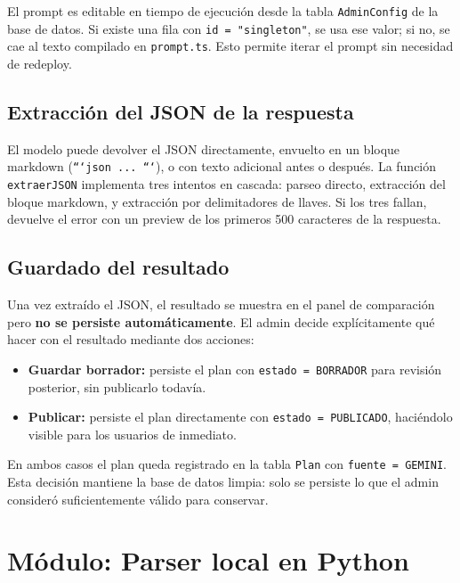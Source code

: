 \documentclass[12pt, a4paper]{report}
\begin{document}
El prompt es editable en tiempo de ejecución desde la tabla \texttt{AdminConfig}
de la base de datos. Si existe una fila con \texttt{id = "singleton"}, se usa ese
valor; si no, se cae al texto compilado en \texttt{prompt.ts}. Esto permite iterar
el prompt sin necesidad de redeploy.

\subsection{Extracción del JSON de la respuesta}

El modelo puede devolver el JSON directamente, envuelto en un bloque markdown
(\texttt{```json ... ```}), o con texto adicional antes o después. La función
\texttt{extraerJSON} implementa tres intentos en cascada: parseo directo,
extracción del bloque markdown, y extracción por delimitadores de llaves.
Si los tres fallan, devuelve el error con un preview de los primeros 500
caracteres de la respuesta.

\subsection{Guardado del resultado}
\label{sec:guardado-resultado}

Una vez extraído el JSON, el resultado se muestra en el panel de comparación pero
\textbf{no se persiste automáticamente}. El admin decide explícitamente qué hacer
con el resultado mediante dos acciones:

\begin{itemize}
  \item \textbf{Guardar borrador:} persiste el plan con \texttt{estado = BORRADOR}
        para revisión posterior, sin publicarlo todavía.
  \item \textbf{Publicar:} persiste el plan directamente con
        \texttt{estado = PUBLICADO}, haciéndolo visible para los usuarios de
        inmediato.
\end{itemize}

En ambos casos el plan queda registrado en la tabla \texttt{Plan} con
\texttt{fuente = GEMINI}. Esta decisión mantiene la base de datos limpia: solo
se persiste lo que el admin consideró suficientemente válido para conservar.

\section{Módulo: Parser local en Python}
\label{sec:modulo-parser}
\end{document}
